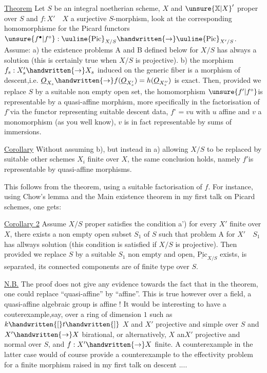 \uline{Theorem} Let $S$ be an integral noetherian scheme, $X$ and $\unsure{\mathbb{X}|X}'$ proper over $S$ and $f:X'\quad X$ a surjective $S$-morphism, look at the corresponding homomorphisme for the Picard functors $\unsure{f^{\bullet}|f^{\circ}}:\text{\uuline{Pic}}_{X/S}\handwritten{\to}\text{\uuline{Pic}}_{X'/S}$. Assume: a) the existence problems A and B defined below for $X/S$ has always a solution (this is certainly true when $X/S$ is projective). b) the morphism $f_{s}:X'_{s}\handwritten{\to}X_{s}$ induced on the generic fiber is a morphism of descent,i.e. $\underline{O}_{X_{s}}\handwritten{\to}f(\underline{O}_{X'_{s}})=h(\underline{O}_{X''_{s}})$ is exact. Then, provided we replace $S$ by a suitable non empty open set, the homomorphism $\unsure{f'|f^{\circ}}$is representable by a quasi-affine morphism, more specifically \unsure{:|;} in the factorisation of $f^{\circ}$via the functor representing suitable descent data, $f^{\circ}=vu$ with $u$ affine and $v$ a monomorphism (as you well know), $v$ is in fact representable by   sums of immersions.

\uline{Corollary} Without assuming b), but instead in a) allowing $X/S$ to be replaced by suitable other schemes $X_{i}$ finite over $X$, the same conclusion  holds, namely $f'$is representable by quasi-affine morphisms.

This follows from the theorem, using a suitable factorisation of $f$. For instance, using Chow's lemma and the Main existence theorem in my first talk on Picard schemes, one gets:

\uline{Corollary 2} Assume $X/S$ proper satisfies the condition a') for every $X'$ finite over $X$, there exists a non empty open subset $S_{1}$ of $S$ such that problem A for $X'\quad S_{1}$ has allways solution  (this condition is satisfied if $X/S$ is projective). Then provided we replace $S$ by a suitable $S_{1}$ non empty and open, $\underline{\mathrm{Pic}}_{X/S}$ exists, is separated, its connected components are of finite type over $S$.

\uline{N.B.} The proof does not give any evidence towards the fact that in
the theorem, one could replace ``quasi-affine'' by ``affine''. This is true however over a field,  a quasi-affine algebraic group is affine ! It would be interesting to have a couterexample,say, over a ring of dimension $1$ such as $k\handwritten{[}t\handwritten{]}$\handwritten{,} $X$ and $X'$ projective and simple over $S$ and $X'\handwritten{\to}X$ birational, or alternatively, $X$ an$X'$ projective and normal over $S$, and $f:X'\handwritten{\to}X$ finite. A counterexample in the latter case would of course provide a counterexample to the effectivity problem for a finite morphism raised in my first talk on descent ....

